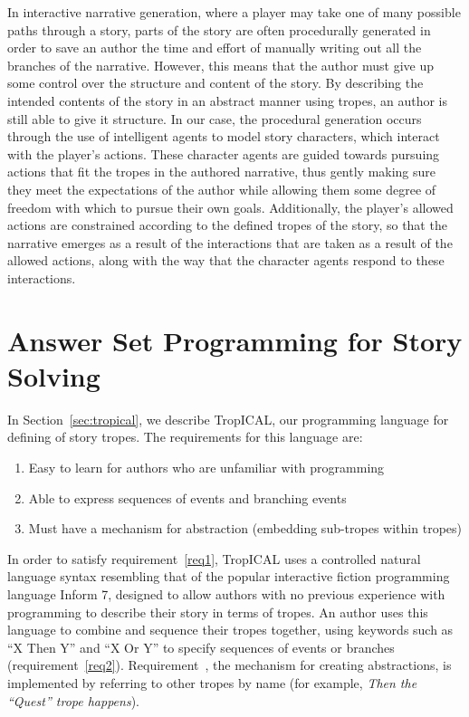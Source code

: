 \documentclass[11pt]{report}
\begin{document}
In interactive narrative generation, where a player may take one of many
possible paths through a story, parts of the story are often procedurally
generated in order to save an author the time and effort of manually writing out
all the branches of the narrative. However, this means that the author must give
up some control over the structure and content of the story. By describing the
intended contents of the story in an abstract manner using tropes, an author is
still able to give it structure. In our case, the procedural generation occurs
through the use of intelligent agents to model story characters, which interact
with the player's actions. These character
agents are guided towards pursuing actions that fit the tropes in the authored
narrative, thus gently making sure they meet the expectations of the author
while allowing them some degree of freedom with which to pursue their own goals.
Additionally, the player's allowed actions are constrained according to the
defined tropes of the story, so that the narrative emerges as a result of the
interactions that are taken as a result of the allowed actions, along with the
way that the character agents respond to these interactions.

\section{Answer Set Programming for Story Solving}
\label{sec:trope-interface}
In Section~\ref{sec:tropical}, we describe TropICAL, our programming language
for defining of story tropes. The requirements for this language are:

\begin{enumerate}
\item Easy to learn for authors who are unfamiliar with programming\label{req1}
  \item Able to express sequences of events and branching events\label{req2}
  \item Must have a mechanism for abstraction (embedding sub-tropes within tropes)\label{req3}
\end{enumerate}

In order to satisfy requirement~\ref{req1}, TropICAL uses a controlled
natural language syntax resembling that of the popular interactive fiction
programming language Inform 7, designed to allow authors with no previous
experience with programming to describe their story in terms of tropes. An
author uses this language to combine and sequence their tropes together, using
keywords such as ``X Then Y'' and ``X Or Y'' to specify sequences of events or
branches (requirement~\ref{req2}). Requirement~\label{req3}, the mechanism for
creating abstractions, is implemented by referring to other tropes by name (for
example, \emph{Then the ``Quest'' trope happens}).
\end{document}
